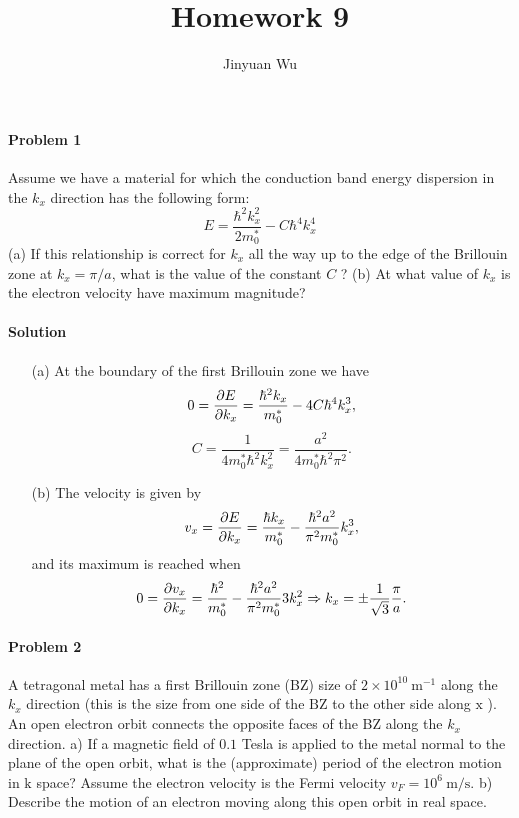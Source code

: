 \documentclass[hyperref, a4paper]{article}
\title{Homework 9}
\author{Jinyuan Wu}
\begin{document}
\maketitle

\paragraph{Problem 1} Assume we have a material for which the conduction band energy dispersion in the $k_x$ direction has the following form:
$$
E=\frac{\hbar^2 k_x^2}{2 m_0^*}-C \hbar^4 k_x^4
$$
(a) If this relationship is correct for $k_x$ all the way up to the edge of the Brillouin zone at $k_x=\pi / a$, what is the value of the constant $C$ ?
(b) At what value of $k_x$ is the electron velocity have maximum magnitude?

\paragraph{Solution} \begin{itemize}
\item[(a)] At the boundary of the first Brillouin zone we have 
\begin{equation}
0 = \pdv{E}{k_x} = \frac{\hbar^2 k_x}{m_0^*} - 4 C \hbar^4 k_x^3,
\end{equation}
\begin{equation}
    C = \frac{1}{4 m_0^* \hbar^2 k_x^2} = \frac{a^2}{4 m_0^* \hbar^2 \pi^2}.
\end{equation}
\item[(b)] The velocity is given by 
\begin{equation}
    v_x = \pdv{E}{k_x} = \frac{\hbar k_x}{m_0^*} - \frac{\hbar^2 a^2}{\pi^2 m_0^*} k_x^3,
\end{equation}
and its maximum is reached when 
\begin{equation}
    0 = \pdv{v_x}{k_x} = \frac{\hbar^2}{m_0^*} - \frac{\hbar^2 a^2}{\pi^2 m_0^*} 3 k_x^2 \Rightarrow
    k_x = \pm \frac{1}{\sqrt{3}} \frac{\pi}{a}.
\end{equation}

\end{itemize}

\paragraph{Problem 2} A tetragonal metal has a first Brillouin zone (BZ) size of $2 \times 10^{10} \mathrm{~m}^{-1}$ along the $k_x$ direction (this is the size from one side of the $\mathrm{BZ}$ to the other side along $\mathrm{x}$ ). An open electron orbit connects the opposite faces of the BZ along the $k_x$ direction.
a) If a magnetic field of $0.1$ Tesla is applied to the metal normal to the plane of the open orbit, what is the (approximate) period of the electron motion in $\mathrm{k}$ space? Assume the electron velocity is the Fermi velocity $v_F=10^6 \mathrm{~m} / \mathrm{s}$.
b) Describe the motion of an electron moving along this open orbit in real space.
\end{document}
